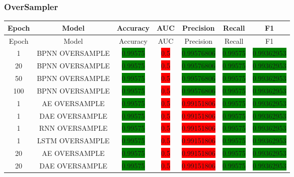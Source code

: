 \subsubsection{OverSampler}
\begin{longtable}{|c|c|c|c|c|c|c|}
	\hline
	Epoch & Model & Accuracy & AUC & Precision & Recall & F1\\ \hline
	\endfirsthead
	\hline
	Epoch & Model & Accuracy & AUC & Precision & Recall & F1\\ \hline
	\endhead
	1 & BPNN OVERSAMPLE & \colorbox{green}{0.99575} & \colorbox{red}{0.5} & \colorbox{green}{0.99576806} & \colorbox{green}{0.99575} & \colorbox{green}{0.99362953}\\ \hline
	20 & BPNN OVERSAMPLE & \colorbox{green}{0.99575} & \colorbox{red}{0.5} & \colorbox{green}{0.99576806} & \colorbox{green}{0.99575} & \colorbox{green}{0.99362953}\\ \hline
	50 & BPNN OVERSAMPLE & \colorbox{green}{0.99575} & \colorbox{red}{0.5} & \colorbox{green}{0.99576806} & \colorbox{green}{0.99575} & \colorbox{green}{0.99362953}\\ \hline
	100 & BPNN OVERSAMPLE & \colorbox{green}{0.99575} & \colorbox{red}{0.5} & \colorbox{green}{0.99576806} & \colorbox{green}{0.99575} & \colorbox{green}{0.99362953}\\ \hline
	1 & AE OVERSAMPLE & \colorbox{green}{0.99575} & \colorbox{red}{0.5} & \colorbox{red}{0.99151806} & \colorbox{green}{0.99575} & \colorbox{green}{0.99362953}\\ \hline
	1 & DAE OVERSAMPLE & \colorbox{green}{0.99575} & \colorbox{red}{0.5} & \colorbox{red}{0.99151806} & \colorbox{green}{0.99575} & \colorbox{green}{0.99362953}\\ \hline
	1 & RNN OVERSAMPLE & \colorbox{green}{0.99575} & \colorbox{red}{0.5} & \colorbox{red}{0.99151806} & \colorbox{green}{0.99575} & \colorbox{green}{0.99362953}\\ \hline
	1 & LSTM OVERSAMPLE & \colorbox{green}{0.99575} & \colorbox{red}{0.5} & \colorbox{red}{0.99151806} & \colorbox{green}{0.99575} & \colorbox{green}{0.99362953}\\ \hline
	20 & AE OVERSAMPLE & \colorbox{green}{0.99575} & \colorbox{red}{0.5} & \colorbox{red}{0.99151806} & \colorbox{green}{0.99575} & \colorbox{green}{0.99362953}\\ \hline
	20 & DAE OVERSAMPLE & \colorbox{green}{0.99575} & \colorbox{red}{0.5} & \colorbox{red}{0.99151806} & \colorbox{green}{0.99575} & \colorbox{green}{0.99362953}\\ \hline

\end{longtable}
